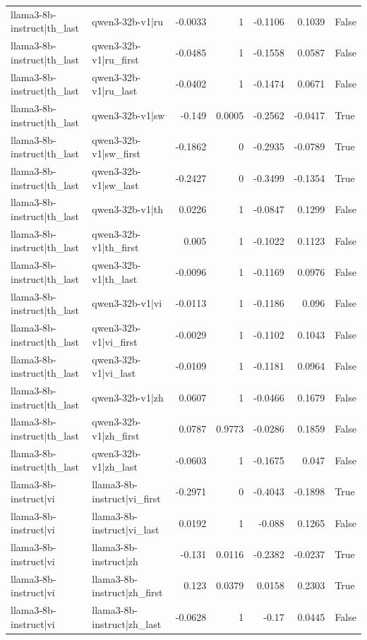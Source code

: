 \begin{table}
\begin{tabular}{l l r r r r l}
llama3-8b-instruct|th_last & qwen3-32b-v1|ru & -0.0033 & 1 & -0.1106 & 0.1039 & False \\
llama3-8b-instruct|th_last & qwen3-32b-v1|ru_first & -0.0485 & 1 & -0.1558 & 0.0587 & False \\
llama3-8b-instruct|th_last & qwen3-32b-v1|ru_last & -0.0402 & 1 & -0.1474 & 0.0671 & False \\
llama3-8b-instruct|th_last & qwen3-32b-v1|sw & -0.149 & 0.0005 & -0.2562 & -0.0417 & True \\
llama3-8b-instruct|th_last & qwen3-32b-v1|sw_first & -0.1862 & 0 & -0.2935 & -0.0789 & True \\
llama3-8b-instruct|th_last & qwen3-32b-v1|sw_last & -0.2427 & 0 & -0.3499 & -0.1354 & True \\
llama3-8b-instruct|th_last & qwen3-32b-v1|th & 0.0226 & 1 & -0.0847 & 0.1299 & False \\
llama3-8b-instruct|th_last & qwen3-32b-v1|th_first & 0.005 & 1 & -0.1022 & 0.1123 & False \\
llama3-8b-instruct|th_last & qwen3-32b-v1|th_last & -0.0096 & 1 & -0.1169 & 0.0976 & False \\
llama3-8b-instruct|th_last & qwen3-32b-v1|vi & -0.0113 & 1 & -0.1186 & 0.096 & False \\
llama3-8b-instruct|th_last & qwen3-32b-v1|vi_first & -0.0029 & 1 & -0.1102 & 0.1043 & False \\
llama3-8b-instruct|th_last & qwen3-32b-v1|vi_last & -0.0109 & 1 & -0.1181 & 0.0964 & False \\
llama3-8b-instruct|th_last & qwen3-32b-v1|zh & 0.0607 & 1 & -0.0466 & 0.1679 & False \\
llama3-8b-instruct|th_last & qwen3-32b-v1|zh_first & 0.0787 & 0.9773 & -0.0286 & 0.1859 & False \\
llama3-8b-instruct|th_last & qwen3-32b-v1|zh_last & -0.0603 & 1 & -0.1675 & 0.047 & False \\
llama3-8b-instruct|vi & llama3-8b-instruct|vi_first & -0.2971 & 0 & -0.4043 & -0.1898 & True \\
llama3-8b-instruct|vi & llama3-8b-instruct|vi_last & 0.0192 & 1 & -0.088 & 0.1265 & False \\
llama3-8b-instruct|vi & llama3-8b-instruct|zh & -0.131 & 0.0116 & -0.2382 & -0.0237 & True \\
llama3-8b-instruct|vi & llama3-8b-instruct|zh_first & 0.123 & 0.0379 & 0.0158 & 0.2303 & True \\
llama3-8b-instruct|vi & llama3-8b-instruct|zh_last & -0.0628 & 1 & -0.17 & 0.0445 & False \\

\end{tabular}
\end{table}
